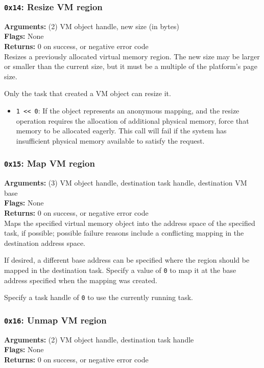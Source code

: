 \documentclass[11pt]{article}
\begin{document}
\subsubsection{{\tt 0x14}: Resize VM region}
\textbf{Arguments:} (2) VM object handle, new size (in bytes) \\
\textbf{Flags:} None \\
\textbf{Returns:} 0 on success, or negative error code \\

Resizes a previously allocated virtual memory region. The new size may be larger or smaller than the current size, but it must be a multiple of the platform's page size.

Only the task that created a VM object can resize it.

\begin{itemize}
\item \texttt{1 << 0}: If the object represents an anonymous mapping, and the resize operation requires the allocation of additional physical memory, force that memory to be allocated eagerly. This call will fail if the system has insufficient physical memory available to satisfy the request.
\end{itemize}

\subsubsection{{\tt 0x15}: Map VM region}
\textbf{Arguments:} (3) VM object handle, destination task handle, destination VM base \\
\textbf{Flags:} None \\
\textbf{Returns:} 0 on success, or negative error code \\

Maps the specified virtual memory object into the address space of the specified task, if possible; possible failure reasons include a conflicting mapping in the destination address space.

If desired, a different base address can be specified where the region should be mapped in the destination task. Specify a value of \texttt{0} to map it at the base address specified when the mapping was created.

Specify a task handle of \texttt{0} to use the currently running task.

\subsubsection{{\tt 0x16}: Unmap VM region}
\textbf{Arguments:} (2) VM object handle, destination task handle \\
\textbf{Flags:} None \\
\textbf{Returns:} 0 on success, or negative error code \\
\end{document}
